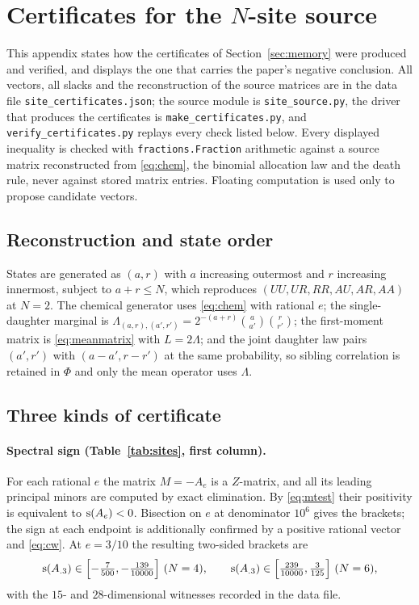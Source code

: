 \section{\texorpdfstring{Certificates for the $N$-site source}%
                        {Certificates for the N-site source}}
\label{app:certs}

This appendix states how the certificates of Section~\ref{sec:memory} were
produced and verified, and displays the one that carries the paper's negative
conclusion. All vectors, all slacks and the reconstruction of the source
matrices are in the data file \texttt{site\_certificates.json}; the source
module is \texttt{site\_source.py}, the driver that produces the certificates
is \texttt{make\_certificates.py}, and \texttt{verify\_certificates.py} replays
every check listed below. Every displayed inequality is checked
with \texttt{fractions.Fraction} arithmetic against a source matrix
reconstructed from \eqref{eq:chem}, the binomial allocation law and the death
rule, never against stored matrix entries. Floating computation is used only to
propose candidate vectors.

\subsection{Reconstruction and state order}

States are generated as $(a,r)$ with $a$ increasing outermost and $r$
increasing innermost, subject to $a+r\le N$, which reproduces
$(UU,UR,RR,AU,AR,AA)$ at $N=2$. The chemical generator uses \eqref{eq:chem}
with rational $e$; the single-daughter marginal is
$\Lambda_{(a,r),(a',r')}=2^{-(a+r)}\binom a{a'}\binom r{r'}$; the first-moment
matrix is \eqref{eq:meanmatrix} with $L=2\Lambda$; and the joint daughter law
pairs $(a',r')$ with $(a-a',r-r')$ at the same probability, so sibling
correlation is retained in $\Phi$ and only the mean operator uses $\Lambda$.

\subsection{Three kinds of certificate}

\paragraph{Spectral sign (Table~\ref{tab:sites}, first column).}
For each rational $e$ the matrix $M=-A_e$ is a $Z$-matrix, and all its leading
principal minors are computed by exact elimination. By \eqref{eq:mtest} their
positivity is equivalent to $\operatorname{s}(A_e)<0$. Bisection on $e$ at denominator
$10^6$ gives the brackets; the sign at each endpoint is additionally confirmed
by a positive rational vector and \eqref{eq:cw}. At $e=3/10$ the resulting
two-sided brackets are
\[
 \spb(A_{.3})\in\Bigl[-\tfrac7{500},-\tfrac{139}{10000}\Bigr]\ (N=4),
 \qquad
 \spb(A_{.3})\in\Bigl[\tfrac{239}{10000},\tfrac3{125}\Bigr]\ (N=6),
\]
with the $15$- and $28$-dimensional witnesses recorded in the data file.

